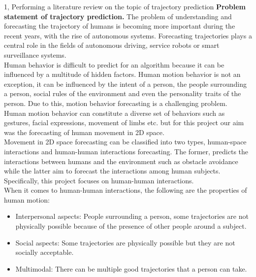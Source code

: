 \documentclass[10pt,a4paper]{article}
\begin{document}
\frontpage

\begin{task}{1, Performing a literature review on the topic of trajectory prediction}
    \textbf{Problem statement of trajectory prediction.} \bigbreak
    The problem of understanding and forecasting the trajectory of humans is becoming more important during the recent years, with the rise of autonomous systems. Forecasting trajectories plays a central role in the fields of autonomous driving, service robots or smart surveillance systems. \\
    Human behavior is difficult to predict for an algorithm because it can be influenced by a multitude of hidden factors. Human motion behavior is not an exception, it can be influenced by the intent of a person, the people surrounding a person, social rules of the environment and even the personality traits of the person. Due to this, motion behavior forecasting is a challenging problem. \\
    Human motion behavior can constitute a diverse set of behaviors such as gestures, facial expressions, movement of limbs etc. but for this project our aim was the forecasting of human movement in 2D space. \\
    Movement in 2D space forecasting can be classified into two types, human-space interactions and human-human interactions forecasting. The former, predicts the interactions between humans and the environment such as obstacle avoidance while the latter aim to forecast the interactions among human subjects. Specifically, this project focuses on human-human interactions. \\
    When it comes to human-human interactions, the following are the properties of human motion:
    
    \begin{itemize}
        \item Interpersonal aspects: People surrounding a person, some trajectories are not physically possible because of the presence of other people around a subject.
        \item Social aspects: Some trajectories are physically possible but they are not socially acceptable.
        \item Multimodal: There can be multiple good trajectories that a person can take.
    \end{itemize}
    
    \bigbreak
    

\end{task}
\end{document}

